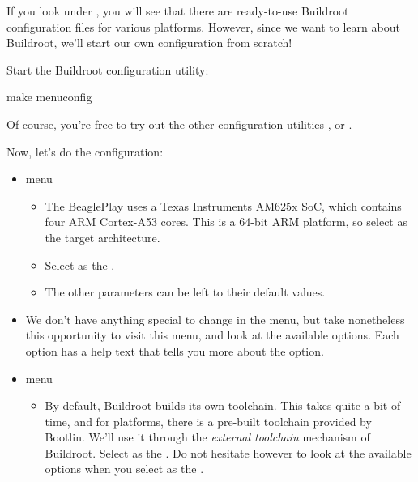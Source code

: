 If you look under , you will see that there are
ready-to-use Buildroot configuration files for various platforms.
However, since we want to learn about Buildroot, we'll start our own
configuration from scratch!

Start the Buildroot configuration utility:

\begin{bashinput}
make menuconfig
\end{bashinput}

Of course, you're free to try out the other configuration utilities
,  or .

Now, let's do the configuration:

\begin{itemize}

\item {} menu

  \begin{itemize}

  \item The BeaglePlay uses a Texas Instruments AM625x SoC, which
    contains four ARM Cortex-A53 cores. This is a 64-bit ARM platform,
    so select  as the target architecture.

  \item Select  as the .

  \item The other parameters can be left to their default values.

  \end{itemize}

\item We don't have anything special to change in the
   menu, but take nonetheless this opportunity to
  visit this menu, and look at the available options. Each option has
  a help text that tells you more about the option.

\item {} menu

  \begin{itemize}

  \item By default, Buildroot builds its own toolchain. This takes
    quite a bit of time, and for  platforms, there is a
    pre-built toolchain provided by Bootlin. We'll use it through the
    {\em external toolchain} mechanism of Buildroot. Select
     as the . Do not
    hesitate however to look at the available options when you select
     as the .


\end{itemize}
\end{itemize}
